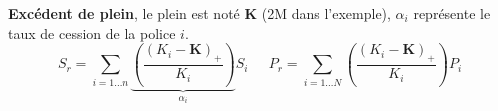 \begin{f}
\textbf{Excédent de plein}, le plein est noté \(\boldsymbol{K}\) (2M\EUR{} dans l'exemple), \(\alpha_i\) représente le taux de cession de la police \(i\).
	\[
	S_r= \sum_{i=1\ldots n}\underbrace{\left(\frac{\left(K_i-\boldsymbol{K} \right)_+ }{K_i} \right)}_{\alpha_i} S_i\quad \ \ P_r=\sum_{i=1\ldots N}\left(\frac{\left(K_i-\boldsymbol{K} \right)_+ }{K_i} \right)P_i 
	\]



\end{f}
